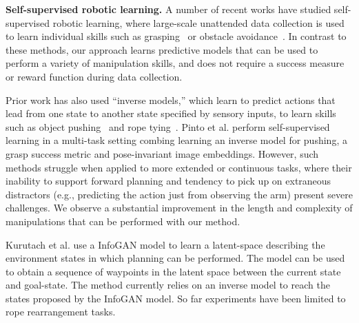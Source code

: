 \noindent \textbf{Self-supervised robotic learning.}
A number of recent works have studied self-supervised robotic learning, where large-scale unattended data collection is used to learn individual skills such as grasping~\cite{mottaghi2016happens, lerrel,google_handeye} or obstacle avoidance~\cite{greg_kahn_uncertainty,crashing}. 
In contrast to these methods, our approach learns predictive models that can be used to perform a variety of manipulation skills, and does not require a success measure or reward function during data collection. 

Prior work has also used ``inverse models,'' which learn to predict actions that lead from one state to another state specified by sensory inputs, to learn skills such as object pushing~\cite{agrawal2016learning} and rope tying~\cite{nair2017combining}.
Pinto et al. \cite{pinto2016curious} perform self-supervised learning in a multi-task setting combing learning an inverse model for pushing, a grasp success metric and pose-invariant image embeddings.
However, such methods struggle when applied to more extended or continuous tasks, where their inability to support forward planning and tendency to pick up on extraneous distractors (e.g., predicting the action just from observing the arm) present severe challenges. We observe a substantial improvement in the length and complexity of manipulations that can be performed with our method.

Kurutach et al. use a InfoGAN model \cite{kurutach2018learning} to learn a latent-space describing the environment states in which planning can be performed. The model can be used to obtain a sequence of waypoints in the latent space between the current state and goal-state. The method currently relies on an inverse model to reach the states proposed by the InfoGAN model. So far experiments have been limited to rope rearrangement tasks.

